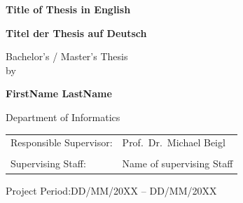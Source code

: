 \begin{titlepage}
\thispagestyle{empty}

\begin{center}
\hbox{}
\vfill
{\usesf\large
{\huge\bfseries Title of Thesis \textbf{in English}\par}
\vskip 0.5cm
{\Large \bfseries Titel der Thesis \textbf{auf Deutsch}\par}
\vskip 1.8cm
Bachelor's / Master's Thesis\\
by\\[2mm]
\vskip 1cm

{\large\bfseries FirstName LastName\\}
\vskip 1.2cm

Department of Informatics\\
\vskip 3cm
\begin{tabular}{p{5.5cm}l}
Responsible Supervisor: & Prof.~Dr.~Michael Beigl \\
&  \\
Supervising Staff: & Name of supervising Staff\\
\end{tabular}
\vskip 3cm
Project Period:\qquad DD/MM/20XX -- DD/MM/20XX
}
\end{center}
\vfill
\end{titlepage}
